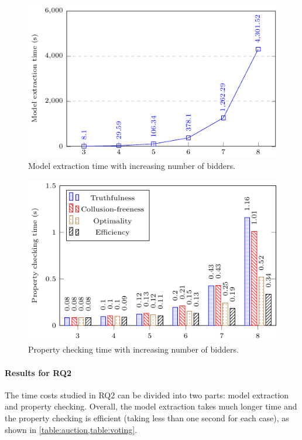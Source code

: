 \begin{figure}[t]
	\centering
	\includegraphics[width=.95\columnwidth]{Figures/Chapter2/modeling-figure0.pdf}
	\caption{Model extraction time with increasing number of bidders.}\label{fig:model-time}
\end{figure}

\begin{figure}[t]
	\centering
	\includegraphics[width=.95\columnwidth]{Figures/Chapter2/checking-figure0.pdf}
	\caption{Property checking time with increasing number of bidders.}\label{fig:check-time}
\end{figure}

\paragraph{Results for RQ2}
The time costs studied in RQ2 can be divided into two parts: model extraction and property
checking.
Overall, the model extraction takes much longer time and the property checking is efficient
(taking less than one second for each case), as shown in \cref{table:auction,table:voting}.

